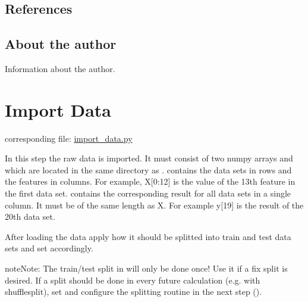 \documentclass[letterpaper,10pt,english]{sphinxmanual}
\begin{document}
\subsection{References}
\label{\detokenize{Overview:references}}

\subsection{About the author}
\label{\detokenize{Overview:about-the-author}}
Information about the author.


\section{Import Data}
\label{\detokenize{Importing_Data:import-data}}\label{\detokenize{Importing_Data::doc}}\label{\detokenize{Importing_Data:id1}}
corresponding file: \href{https://github.com/weinertmos/ForestFire/blob/master/source/ForestFire/import\_data.py}{import\_data.py}

In this step the raw data is imported.
It must consist of two numpy arrays  and  which are located in the same directory as .
 contains the data sets in rows and the features in columns.
For example, X{[}0:12{]} is the value of the 13th feature in the first data set.
 contains the corresponding result for all data sets in a single column.
It must be of the same length as X.
For example y{[}19{]} is the result of the 20th data set.

After loading the data apply how it should be splitted into train and test data sets and set  accordingly.

\begin{sphinxadmonition}{note}{Note:}
The train/test split in  will only be done once!
Use it if a fix split is desired.
If a split should be done in every future calculation (e.g. with shufflesplit),
set  and configure the splitting routine
in the next step ({\hyperref[\detokenize{Generate_Database:compute}]{}}).
\end{sphinxadmonition}
\end{document}
